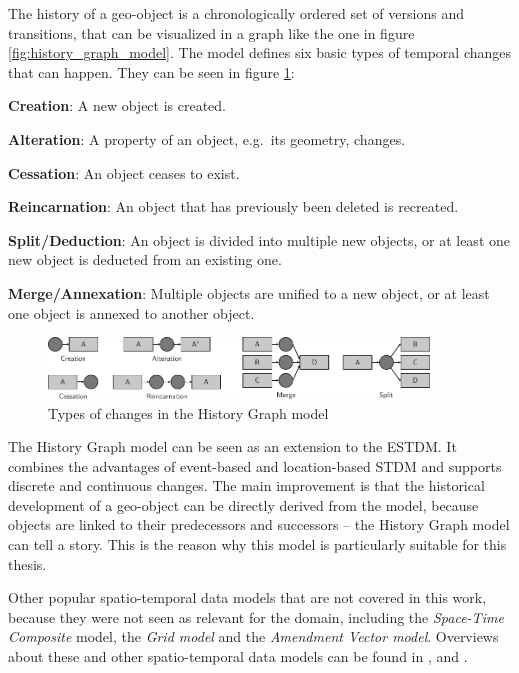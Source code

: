 The history of a geo-object is a chronologically ordered set of versions and transitions, that can be visualized in a graph like the one in figure \ref{fig:history_graph_model}.
The model defines six basic types of temporal changes that can happen. They can be seen in figure \ref{fig:history_graph_changes}:

\begin{compactitem}
  \item \textbf{Creation}:           A new object is created.
  \item \textbf{Alteration}:         A property of an object, e.g.\ its geometry, changes.
  \item \textbf{Cessation}:          An object ceases to exist.
  \item \textbf{Reincarnation}:      An object that has previously been deleted is recreated.
  \item \textbf{Split/Deduction}:    An object is divided into multiple new objects, or at least one new object is deducted from an existing one.
  \item \textbf{Merge/Annexation}:   Multiple objects are unified to a new object, or at least one object is annexed to another object.
\end{compactitem}

\begin{figure}[ht]
  \vspace{1em}
  \centering
  \includegraphics[width=0.9\textwidth]{graphics/basics/stdm/history_graph_changes}
  \caption{Types of changes in the History Graph model}
  \label{fig:history_graph_changes}
\end{figure}

The History Graph model can be seen as an extension to the ESTDM. It combines the advantages of event-based and location-based STDM and supports discrete and continuous changes. The main improvement is that the historical development of a geo-object can be directly derived from the model, because objects are linked to their predecessors and successors -- the History Graph model can tell a story. This is the reason why this model is particularly suitable for this thesis.


Other popular spatio-temporal data models that are not covered in this work, because they were not seen as relevant for the domain, including the \emph{Space-Time Composite} model, the \emph{Grid model} and the \emph{Amendment Vector model}. Overviews about these and other spatio-temporal data models can be found in \cite{zhao11}, \cite{pelekis04stdms} and \cite{peuquet99}.

